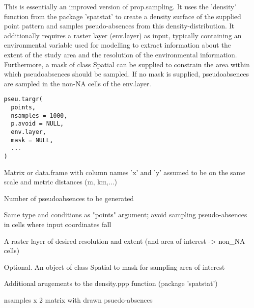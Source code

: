 \documentclass[a4paper]{book}
\begin{document}
%
\begin{Description}\relax
This is essentially an improved version of prop.sampling. It uses the 'density'
function from the package 'spatstat' to create a density surface of the supplied
point pattern and samples pseudo-absences from this density-distribution. It
additionally requires a raster layer (env.layer) as input, typically containing
an environmental variable used for modelling to extract information about the
extent of the study area and the resolution of the environmental information.
Furthermore, a mask of class Spatial can be supplied to constrain the
area within which pseudoabsences should be sampled. If no mask is supplied,
pseudoabsences are sampled in the non-NA cells of the env.layer.
\end{Description}
%
\begin{Usage}
\begin{verbatim}
pseu.targr(
  points,
  nsamples = 1000,
  p.avoid = NULL,
  env.layer,
  mask = NULL,
  ...
)
\end{verbatim}
\end{Usage}
%
\begin{Arguments}
\begin{ldescription}
\item[\code{points}] Matrix or data.frame with column names 'x' and 'y' assumed to
be on the same scale and metric distances (m, km,...)

\item[\code{nsamples}] Number of pseudoabsences to be generated

\item[\code{p.avoid}] Same type and conditions as "points" argument; avoid sampling
pseudo-absences in cells where input coordinates fall

\item[\code{env.layer}] A raster layer of desired resolution and extent (and area
of interest -> non\_NA cells)

\item[\code{mask}] Optional. An object of class Spatial to mask for sampling area of interest

\item[\code{...}] Additional arugements to the density.ppp function (package 'spatstat')
\end{ldescription}
\end{Arguments}
%
\begin{Value}
nsamples x 2 matrix with drawn psuedo-absences
\end{Value}
\end{document}
